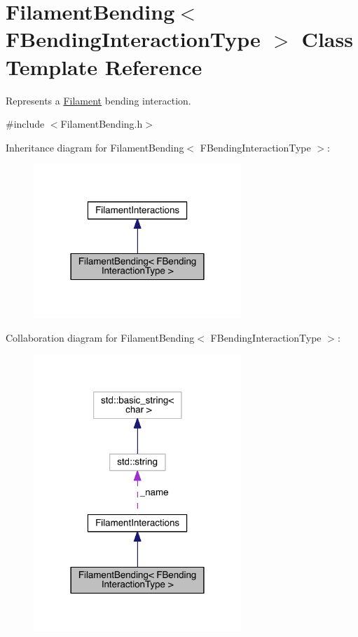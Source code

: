 \hypertarget{classFilamentBending}{\section{Filament\+Bending$<$ F\+Bending\+Interaction\+Type $>$ Class Template Reference}
\label{classFilamentBending}
}


Represents a \hyperlink{classFilament}{Filament} bending interaction.  




{\ttfamily \#include $<$Filament\+Bending.\+h$>$}



Inheritance diagram for Filament\+Bending$<$ F\+Bending\+Interaction\+Type $>$\+:
\nopagebreak
\begin{figure}[H]
\begin{center}
\leavevmode
\includegraphics[width=222pt]{classFilamentBending__inherit__graph}
\end{center}
\end{figure}


Collaboration diagram for Filament\+Bending$<$ F\+Bending\+Interaction\+Type $>$\+:
\nopagebreak
\begin{figure}[H]
\begin{center}
\leavevmode
\includegraphics[width=222pt]{classFilamentBending__coll__graph}
\end{center}
\end{figure}
